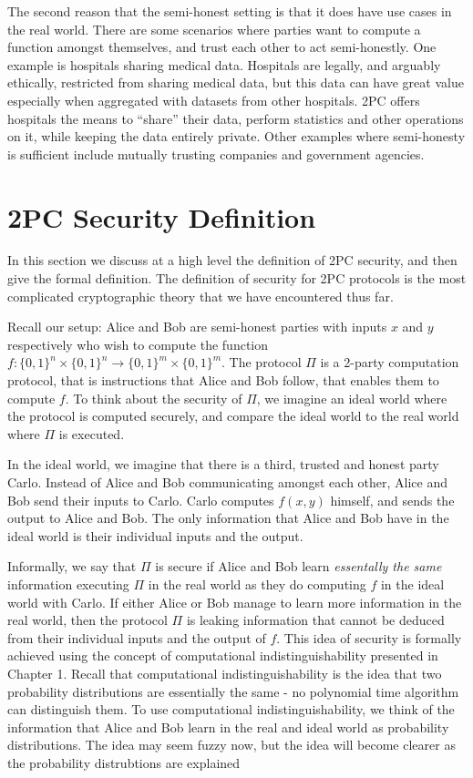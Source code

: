 The second reason that the semi-honest setting is that it does have use cases in the real world.
There are some scenarios where parties want to compute a function amongst themselves, and trust each other to act semi-honestly.
One example is hospitals sharing medical data.
Hospitals are legally, and arguably ethically, restricted from sharing medical data, but this data can have great value especially when aggregated with datasets from other hospitals.
2PC offers hospitals the means to ``share'' their data, perform statistics and other operations on it, while keeping the data entirely private. 
Other examples where semi-honesty is sufficient include mutually trusting companies and government agencies.

\section{2PC Security Definition}
In this section we discuss at a high level the definition of 2PC security, and then give the formal definition. 
The definition of security for 2PC protocols is the most complicated cryptographic theory that we have encountered thus far. 

Recall our setup: Alice and Bob are semi-honest parties with inputs $x$ and $y$ respectively who wish to compute the function $f: \{0,1\}^n \times \{0,1\}^n \to \{0,1\}^m \times \{0,1\}^m$.
The protocol $\Pi$ is a 2-party computation protocol, that is instructions that Alice and Bob follow, that enables them to compute $f$.
To think about the security of $\Pi$, we imagine an ideal world where the protocol is computed securely, and compare the ideal world to the real world where $\Pi$ is executed.

In the ideal world, we imagine that there is a third, trusted and honest party Carlo.
Instead of Alice and Bob communicating amongst each other, Alice and Bob send their inputs to Carlo.
Carlo computes $f(x,y)$ himself, and sends the output to Alice and Bob.
The only information that Alice and Bob have in the ideal world is their individual inputs and the output.

Informally, we say that $\Pi$ is secure if Alice and Bob learn \textit{essentally the same} information executing $\Pi$ in the real world as they do computing $f$ in the ideal world with Carlo.
If either Alice or Bob manage to learn more information in the real world, then the protocol $\Pi$ is leaking information that cannot be deduced from their individual inputs and the output of $f$.
This idea of security is formally achieved using the concept of computational indistinguishability presented in Chapter 1. 
Recall that computational indistinguishability is the idea that two probability distributions are essentially the same - no polynomial time algorithm can distinguish them.
To use computational indistinguishability, we think of the information that Alice and Bob learn in the real and ideal world as probability distributions.
The idea may seem fuzzy now, but the idea will become clearer as the probability distrubtions are explained

